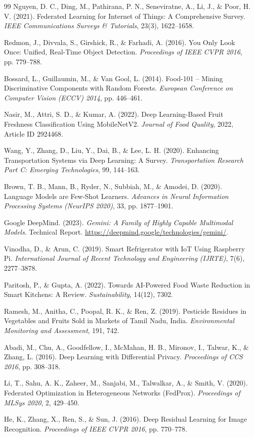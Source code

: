 \documentclass[12pt,a4paper]{report}
\begin{document}
\begin{thebibliography}{99}
Nguyen, D. C., Ding, M., Pathirana, P. N., Seneviratne, A., Li, J., \& Poor, H. V. (2021). Federated Learning for Internet of Things: A Comprehensive Survey. \textit{IEEE Communications Surveys \& Tutorials}, 23(3), 1622--1658.

Redmon, J., Divvala, S., Girshick, R., \& Farhadi, A. (2016). You Only Look Once: Unified, Real-Time Object Detection. \textit{Proceedings of IEEE CVPR 2016}, pp. 779--788.

Bossard, L., Guillaumin, M., \& Van Gool, L. (2014). Food-101 -- Mining Discriminative Components with Random Forests. \textit{European Conference on Computer Vision (ECCV) 2014}, pp. 446--461.

Nasir, M., Attri, S. D., \& Kumar, A. (2022). Deep Learning-Based Fruit Freshness Classification Using MobileNetV2. \textit{Journal of Food Quality}, 2022, Article ID 2924468.

Wang, Y., Zhang, D., Liu, Y., Dai, B., \& Lee, L. H. (2020). Enhancing Transportation Systems via Deep Learning: A Survey. \textit{Transportation Research Part C: Emerging Technologies}, 99, 144--163.

Brown, T. B., Mann, B., Ryder, N., Subbiah, M., \& Amodei, D. (2020). Language Models are Few-Shot Learners. \textit{Advances in Neural Information Processing Systems (NeurIPS 2020)}, 33, pp. 1877--1901.

Google DeepMind. (2023). \textit{Gemini: A Family of Highly Capable Multimodal Models}. Technical Report. \url{https://deepmind.google/technologies/gemini/}.

Vinodha, D., \& Arun, C. (2019). Smart Refrigerator with IoT Using Raspberry Pi. \textit{International Journal of Recent Technology and Engineering (IJRTE)}, 7(6), 2277--3878.

Paritosh, P., \& Gupta, A. (2022). Towards AI-Powered Food Waste Reduction in Smart Kitchens: A Review. \textit{Sustainability}, 14(12), 7302.

Ramesh, M., Anitha, C., Poopal, R. K., \& Ren, Z. (2019). Pesticide Residues in Vegetables and Fruits Sold in Markets of Tamil Nadu, India. \textit{Environmental Monitoring and Assessment}, 191, 742.

Abadi, M., Chu, A., Goodfellow, I., McMahan, H. B., Mironov, I., Talwar, K., \& Zhang, L. (2016). Deep Learning with Differential Privacy. \textit{Proceedings of CCS 2016}, pp. 308--318.

Li, T., Sahu, A. K., Zaheer, M., Sanjabi, M., Talwalkar, A., \& Smith, V. (2020). Federated Optimization in Heterogeneous Networks (FedProx). \textit{Proceedings of MLSys 2020}, 2, 429--450.

He, K., Zhang, X., Ren, S., \& Sun, J. (2016). Deep Residual Learning for Image Recognition. \textit{Proceedings of IEEE CVPR 2016}, pp. 770--778.

\end{thebibliography}
\end{document}
